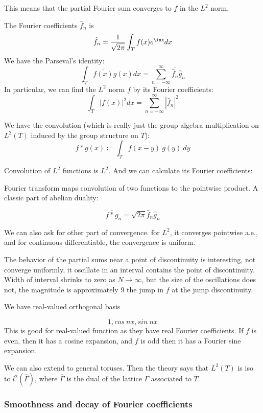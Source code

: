 \documentclass[main.tex]{subfiles}
\begin{document}
This means that the partial Fourier sum converges to $f$ in the $L^2$ norm. 

The Fourier coefficients $\hat{f}_n$ is 
$$
\hat{f}_n = \frac{1}{\sqrt{2 \pi}} \int_T f(x) e^{\inx} dx
$$
We have the Parseval's identity:
$$
\int_T \overline{f(x)} g(x) dx = \sum_{n = -\infty} ^{\infty} \overline{\hat{f}_n} \hat{g}_n
$$
In particular, we can find the $L^2$ norm $f$ by its Fourier coefficients:
$$
\int_T |f(x)|^2 dx = \sum_{n = -\infty} ^{\infty} |\hat{f}_n|^2
$$

We have the convolution (which is really just the group algebra multiplication on $L^2(T)$ induced by the group structure on $T$):
$$
f * g(x) \coloneqq \int_T f(x-y)\ g(y)\  dy
$$

Convolution of $L^2$ functions is $L^2$. And we can calculate its Fourier coefficients:

Fourier transform maps convolution of two functions to the pointwise product. A classic part of abelian duality:
\begin{theorem}
$$
\overline{f * g}_n = \sqrt{2\pi} \hat{f}_n \hat{g}_n
$$
\end{theorem}

We can also ask for other part of convergence. for $L^2$, it converges pointwise a.e., and for continuous differentiable, the convergence is uniform.

The behavior of the partial sums near a point of discontinuity is interesting, not converge uniformly, it oscillate in an interval contains the point of discontinuity. Width of interval shrinks to zero as $N \rightarrow \infty$, but the size of the oscillations does not, the magnitude is approximately $9$ the jump in $f$ at the jump discontinuity.

We have real-valued orthogonal basis 

$$
1, cos\ nx, sin\ nx
$$
This is good for real-valued function as they have real Fourier coefficients. If $f$ is even, then it has a cosine expansion, and $f$ is odd then it has a Fourier sine expansion.

We can also extend to general toruses. Then the theory says that $L^2(T)$ is iso to $l^2(\hat{\Gamma})$, where $\hat{\Gamma}$ is the dual of the lattice $\Gamma$ associated to $T$.

\subsubsection{Smoothness and decay of Fourier coefficients}
\end{document}
